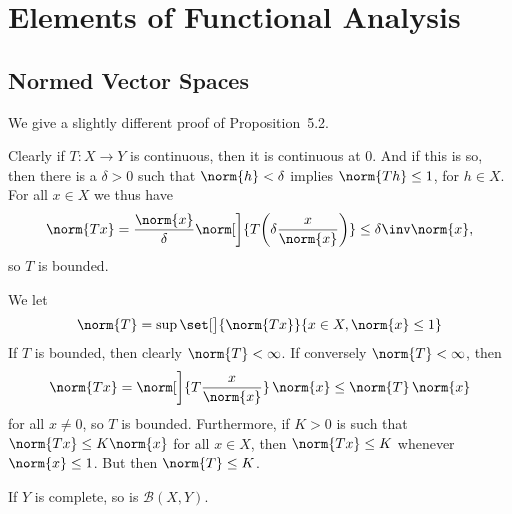 \documentclass[article, a4paper, 11pt, oneside]{memoir}
\numberwithin{equation}{chapter}
\newcommand{\calB}{\mathcal{B}}
\theoremstyle{nonumberplain}
\begin{document}
\chapter{Elements of Functional Analysis}

\section{Normed Vector Spaces}

\begin{remark}
	We give a slightly different proof of Proposition~5.2.

	Clearly if $T \colon X \to Y$ is continuous, then it is continuous at $0$. And if this is so, then there is a $\delta > 0$ such that $\norm{h} < \delta$ implies $\norm{Th} \leq 1$, for $h \in X$. For all $x \in X$ we thus have
	\begin{equation*}
		\norm{Tx}
			= \frac{\norm{x}}{\delta} \norm[\bigg]{T \biggl( \delta \frac{x}{\norm{x}} \biggr) }
			\leq \delta\inv \norm{x},
	\end{equation*}
	so $T$ is bounded.

	We let
	\begin{equation*}
		\norm{T}
			= \sup \set[\big]{\norm{Tx}}{x \in X, \norm{x} \leq 1}
	\end{equation*}
	If $T$ is bounded, then clearly $\norm{T} < \infty$. If conversely $\norm{T} < \infty$, then
	\begin{equation*}
		\norm{Tx}
			= \norm[\bigg]{T \frac{x}{\norm{x}} } \, \norm{x}
			\leq \norm{T} \, \norm{x}
	\end{equation*}
	for all $x \neq 0$, so $T$ is bounded. Furthermore, if $K > 0$ is such that $\norm{Tx} \leq K \norm{x}$ for all $x \in X$, then $\norm{Tx} \leq K$ whenever $\norm{x} \leq 1$. But then $\norm{T} \leq K$.
\end{remark}


\begin{exerciseframed*}[3]
	If $Y$ is complete, so is $\calB(X,Y)$.
\end{exerciseframed*}
\end{document}
